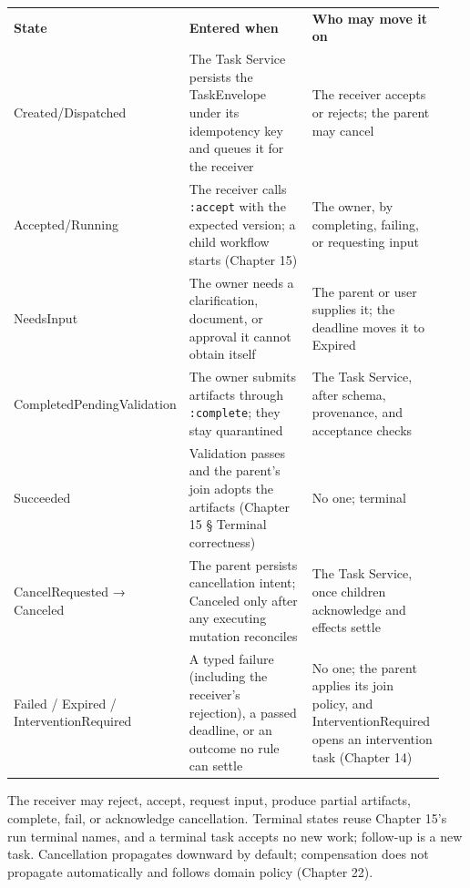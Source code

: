 \BookTableStart
\small
\begin{tabular}{@{}Y{0.3133\linewidth}Y{0.3133\linewidth}Y{0.3133\linewidth}@{}}
\color{white}\bfseries \textbf{State} & \color{white}\bfseries \textbf{Entered when} & \color{white}\bfseries \textbf{Who may move it on} \\
Created/Dispatched & The Task Service persists the TaskEnvelope under its idempotency key and queues it for the receiver & The receiver accepts or rejects; the parent may cancel \\
Accepted/Running & The receiver calls \lstinline[style=bookinline]!:accept! with the expected version; a child workflow starts (Chapter 15) & The owner, by completing, failing, or requesting input \\
NeedsInput & The owner needs a clarification, document, or approval it cannot obtain itself & The parent or user supplies it; the deadline moves it to Expired \\
CompletedPendingValidation & The owner submits artifacts through \lstinline[style=bookinline]!:complete!; they stay quarantined & The Task Service, after schema, provenance, and acceptance checks \\
Succeeded & Validation passes and the parent's join adopts the artifacts (Chapter 15 § Terminal correctness) & No one; terminal \\
CancelRequested → Canceled & The parent persists cancellation intent; Canceled only after any executing mutation reconciles & The Task Service, once children acknowledge and effects settle \\
Failed / Expired / InterventionRequired & A typed failure (including the receiver's rejection), a passed deadline, or an outcome no rule can settle & No one; the parent applies its join policy, and InterventionRequired opens an intervention task (Chapter 14) \\
\end{tabular}
\BookTableEnd

The receiver may reject, accept, request input, produce partial artifacts, complete, fail, or acknowledge cancellation. Terminal states reuse Chapter 15's run terminal names, and a terminal task accepts no new work; follow-up is a new task. Cancellation propagates downward by default; compensation does not propagate automatically and follows domain policy (Chapter 22).\par

